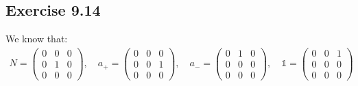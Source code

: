 \documentclass[]{ctexart}
\begin{document}
	\subsection{Exercise 9.14}
		We know that:
			\begin{equation*}
			\begin{aligned}
				N=\left(\begin{array}{lll}
				0 & 0 & 0 \\
				0 & 1 & 0 \\
				0 & 0 & 0
				\end{array}\right), \quad a_{+}=\left(\begin{array}{lll}
				0 & 0 & 0 \\
				0 & 0 & 1 \\
				0 & 0 & 0
				\end{array}\right), \quad a_{-}=\left(\begin{array}{lll}
				0 & 1 & 0 \\
				0 & 0 & 0 \\
				0 & 0 & 0
				\end{array}\right), \quad \mathds{1}=\left(\begin{array}{lll}
				0 & 0 & 1 \\
				0 & 0 & 0 \\
				0 & 0 & 0
				\end{array}\right)
			\end{aligned}
			\end{equation*}
			
\end{document}
